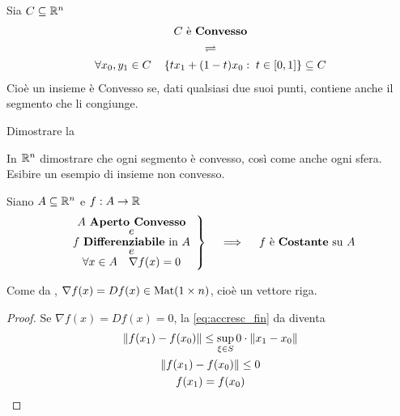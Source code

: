 \begin{definition}
	\label{def:convesso}
	Sia $C \subseteq \mathbb{R}^n$
	\begin{equation*}
		\begin{gathered}
			C \text{ è \textbf{Convesso}}\\
			\rightleftharpoons\\
			\forall x_0,y_1 \in C \quad \left\{tx_1+(1-t)x_0:\; t \in \left[0,1\right]\right\} \subseteq C
		\end{gathered}
	\end{equation*}
	Cioè un insieme è Convesso se, dati qualsiasi due suoi punti, contiene anche il segmento che li congiunge.
\end{definition}
\begin{exercise}
	Dimostrare la 
\end{exercise}
\begin{exercise}
	In $\mathbb{R}^n$ dimostrare che ogni segmento è convesso, così come anche ogni sfera.\\
	Esibire un esempio di insieme non convesso.
\end{exercise}
\begin{corollary}
	\label{coro:convess_nabla_0_f_const}
	Siano $A \subseteq \mathbb{R}^n$ e $f: A \to \mathbb{R}$
	\[
		\left.
			\begin{array}{c}
				A \text{ \textbf{Aperto Convesso}}\\[-1ex]
				e\\[-0.5ex]
				f \text{ \textbf{Differenziabile} in } A\\[-1ex]
				e\\[-0.5ex]
				\forall x \in A \quad \nabla f(x) = 0
			\end{array}
		\right\}
		\quad \implies \quad
		f \text{ è \textbf{Costante} su } A
	\]
	\vspace*{-\baselineskip}
	\begin{note}
		Come da , $\nabla f(x) = Df(x) \in \operatorname{Mat} (1 \times n)$, cioè un vettore riga.
	\end{note}
	\begin{proof}
		Se $\nabla f(x) = Df(x) = 0$, la \cref{eq:accresc_fin} da  diventa
		\begin{equation*}
			\begin{gathered}
				\left\|f(x_1) - f(x_0)\right\| \leq \sup\limits_{\xi \in S} 0 \cdot \left\|x_1-x_0\right\|\\
				\left\|f(x_1) - f(x_0)\right\| \leq 0\\
				f(x_1) = f(x_0)
			\end{gathered}
		\end{equation*}
	\end{proof}
\end{corollary}
